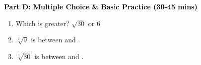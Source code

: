 \documentclass[12pt, letterpaper, fleqn]{article}
\newcommand{\blank}{\underline{\hspace{2.2cm}}}
\begin{document}
\newpage

\begin{tcolorbox}[colback=customteal!20]
\large\textcolor{black}{\textbf{Part D: Multiple Choice \& Basic Practice (30-45 mins)}}
\end{tcolorbox}

\vspace{3mm}

\begin{enumerate}[itemsep=2.5cm, leftmargin=0.6cm, resume]
\item Which is greater? $\sqrt{30}$ or $6$ \blank
\item $\sqrt[3]{9}$ is between \blank and \blank.
\item $\sqrt[3]{30}$ is between \blank and \blank.
\end{enumerate}
\end{document}
